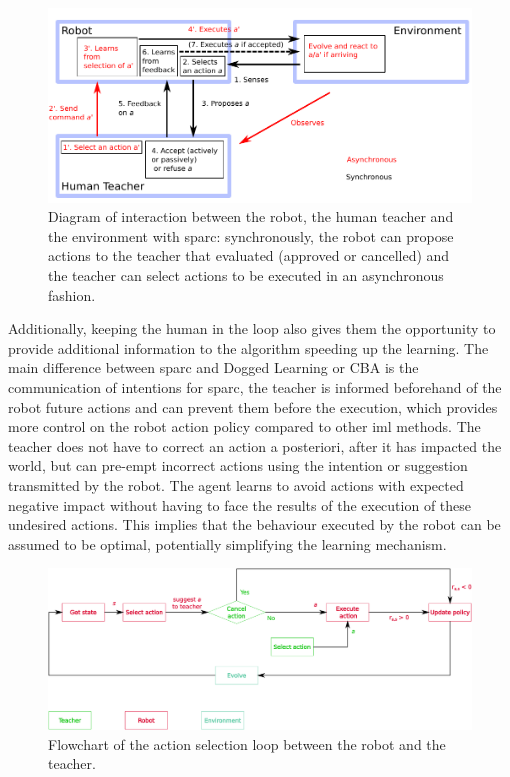 \begin{figure}[ht]
	\includegraphics[width=1\linewidth]{diagram.pdf}
	\centering
	\caption{Diagram of interaction between the robot, the human teacher and the environment with \gls{sparc}: synchronously, the robot can propose actions to the teacher that evaluated (approved or cancelled) and the teacher can select actions to be executed in an asynchronous fashion.}
	\label{fig:sparc_diagram}
\end{figure}

Additionally, keeping the human in the loop also gives them the opportunity to provide additional information to the algorithm speeding up the learning. The main difference between \gls{sparc} and Dogged Learning or CBA \citep{chernova2009interactive} is the communication of intentions for \gls{sparc}, the teacher is informed beforehand of the robot future actions and can prevent them before the execution, which provides more control on the robot action policy compared to other \gls{iml} methods. The teacher does not have to correct an action a posteriori, after it has impacted the world, but can pre-empt incorrect actions using the intention or suggestion transmitted by the robot. The agent learns to avoid actions with expected negative impact without having to face the results of the execution of these undesired actions. This implies that the behaviour executed by the robot can be assumed to be optimal, potentially simplifying the learning mechanism.

\begin{figure}[ht]
	\includegraphics[width=1\linewidth]{flowchart.pdf}
	\centering
	\caption{Flowchart of the action selection loop between the robot and the teacher.}
	\label{fig:sparc_flowchart}
\end{figure}

